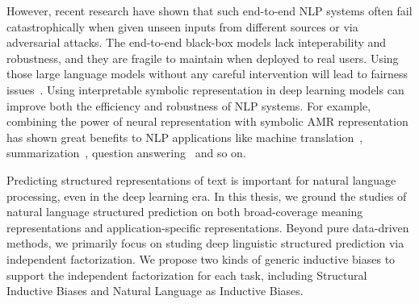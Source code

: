 However, recent research have shown that such end-to-end NLP systems
often fail catastrophically when given unseen inputs from different
sources or via adversarial attacks. The end-to-end black-box models
lack inteperability and robustness, and they are fragile to maintain
when deployed to real users. Using those large language models without
any careful intervention will lead to fairness
issues~\citep{bommasani2021opportunities}.  Using interpretable
symbolic representation in deep learning models can improve both the
efficiency and robustness of NLP systems. For example, combining the
power of neural representation with symbolic AMR representation has
shown great benefits to NLP applications like machine
translation~\citep{song2019semantic},
summarization~\citep{liu2015toward}, question
answering~\citep{kapanipathi2021leveraging} and so on.

Predicting structured representations of text is important for natural
language processing, even in the deep learning era. In this thesis, we
ground the studies of natural language structured prediction on both
broad-coverage meaning representations and application-specific
representations. Beyond pure data-driven methods, we primarily focus
on studing deep linguistic structured prediction via independent
factorization. We propose two kinds of generic inductive biases to
support the independent factorization for each task, including
Structural Inductive Biases and Natural Language as Inductive Biases.

%





